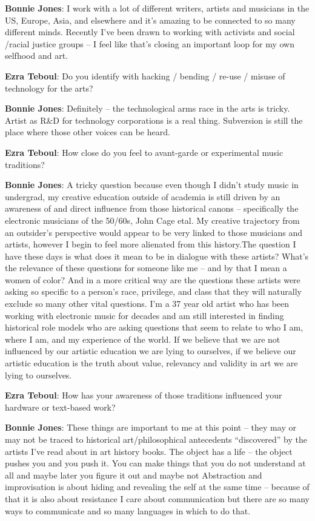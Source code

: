 \textbf{Bonnie Jones}: I work with a lot of different writers, artists and musicians in the US, Europe, Asia, and elsewhere and it’s amazing to be connected to so many different minds. Recently I’ve been drawn to working with activists and social /racial justice groups – I feel like that’s closing an important loop for my own selfhood and art. 

\textbf{Ezra Teboul}: Do you identify with hacking / bending / re-use / misuse of technology for the arts?

\textbf{Bonnie Jones}: Definitely – the technological arms race in the arts is tricky. Artist as R\&D for technology corporations is a real thing. Subversion is still the place where those other voices can be heard. 

\textbf{Ezra Teboul}: How close do you feel to avant-garde or experimental music traditions?

\textbf{Bonnie Jones}: A tricky question because even though I didn’t study music in undergrad, my creative education outside of academia is still driven by an awareness of and direct influence from those historical canons – specifically the electronic musicians of the 50/60s, John Cage etal. My creative trajectory from an outsider’s perspective would appear to be very linked to those musicians and artists, however I begin to feel more alienated from this history.The question I have these days is what does it mean to be in dialogue with these artists? What’s the relevance of these questions for someone like me – and by that I mean a women of color? And in a more critical way are the questions these artists were asking so specific to a person’s race, privilege, and class that they will naturally exclude so many other vital questions. I’m a 37 year old artist who has been working with electronic music for decades and am still interested in finding historical role models who are asking questions that seem to relate to who I am, where I am, and my experience of the world. If we believe that we are not influenced by our artistic education we are lying to ourselves, if we believe our artistic education is the truth about value, relevancy and validity in art we are lying to ourselves. 

\textbf{Ezra Teboul}: How has your awareness of those traditions influenced your hardware or text-based work? 

\textbf{Bonnie Jones}: These things are important to me at this point – they may or may not be traced to historical art/philosophical antecedents ``discovered'' by the artists I’ve read about in art history books. The object has a life – the object pushes you and you push it. You can make things that you do not understand at all and maybe later you figure it out and maybe not Abstraction and improvisation is about hiding and revealing the self at the same time – because of that it is also about resistance 
I care about communication but there are so many ways to communicate and so many languages in which to do that.

